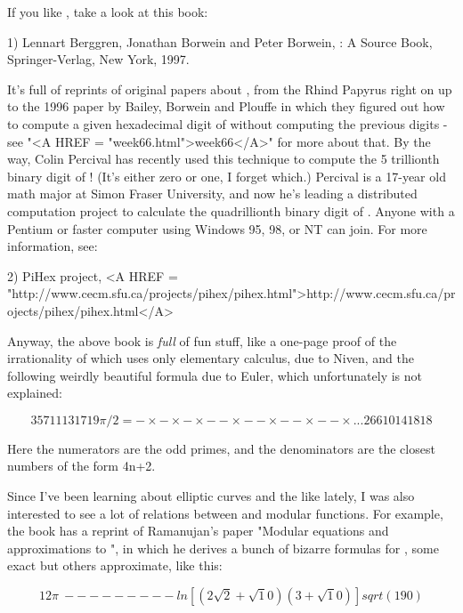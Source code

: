 

If you like \pi , take a look at this book:

1) Lennart Berggren, Jonathan Borwein and Peter Borwein, \Pi : A Source
Book, Springer-Verlag, New York, 1997.

It's full of reprints of original papers about \pi , from the Rhind
Papyrus right on up to the 1996 paper by Bailey, Borwein and Plouffe in
which they figured out how to compute a given hexadecimal digit of \pi 
without computing the previous digits - see "<A HREF = "week66.html">week66</A>" for more about
that.  By the way, Colin Percival has recently used this technique to
compute the 5 trillionth binary digit of \pi !  (It's either zero or one,
I forget which.)  Percival is a 17-year old math major at Simon Fraser
University, and now he's leading a distributed computation project to
calculate the quadrillionth binary digit of \pi .  Anyone with a Pentium
or faster computer using Windows 95, 98, or NT can join.   For more
information, see:

2) PiHex project, <A HREF = "http://www.cecm.sfu.ca/projects/pihex/pihex.html">http://www.cecm.sfu.ca/projects/pihex/pihex.html</A>

Anyway, the above book is \emph{full} of fun stuff, like a one-page proof 
of the irrationality of \pi  which uses only elementary calculus, due 
to Niven, and the following weirdly beautiful formula due to Euler, 
which unfortunately is not explained:


$$

              3   5   7   11   13   17   19
       \pi /2 = - \times  - \times  - \times  -- \times  -- \times  -- \times  -- \times  ...
              2   6   6   10   14   18   18
$$
    
Here the numerators are the odd primes, and the denominators are the
closest numbers of the form 4n+2.  

Since I've been learning about elliptic curves and the like lately, I
was also interested to see a lot of relations between \pi  and modular
functions.  For example, the book has a reprint of Ramanujan's  paper
"Modular equations and approximations to \pi ", in which he derives  a
bunch of bizarre formulas for \pi , some exact but others approximate,
like this:


$$

              12
      \pi  ~ ---------  ln[ (2 \sqrt 2 + \sqrt 10) (3 + \sqrt 10) ]
           sqrt(190)
$$
    
